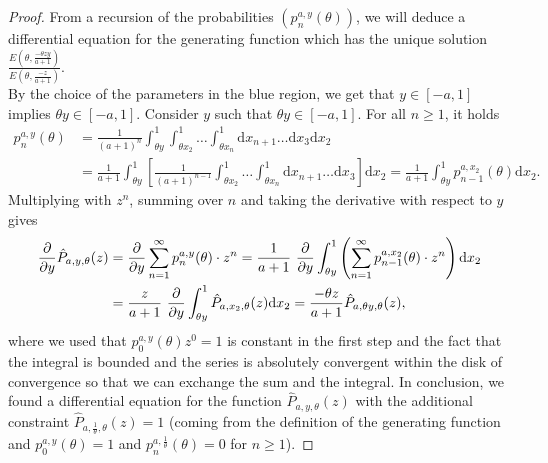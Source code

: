 \documentclass[12pt]{article}
\renewcommand{\P}{\mathbb{P}} %
\newcommand{\1}{\mathds{1}}
\renewcommand{\d}{\mathrm{d}}
\theoremstyle{definition}
\theoremstyle{plain}
\theoremstyle{remark}
\begin{document}
    \begin{proof}
        From a recursion of the probabilities $(p_n^{a,y}(\theta))$, we will deduce a differential equation for the generating function which has the unique solution $\frac{E\left(\theta,\frac{-\theta zy}{a+1}\right)}{E\left(\theta,\frac{-z}{a+1}\right)}$. \\
        By the choice of the parameters in the blue region, we get that $y\in[-a,1]$ implies $\theta y\in[-a,1]$. Consider $y$ such that $\theta y\in[-a,1]$. For all $n\geq 1$, it holds
        \begin{align*}
            p_n^{a,y}(\theta)&=\frac{1}{(a+1)^n}\int_{\theta y}^1\int_{\theta x_2}^1\dots\int_{\theta x_n}^1 \d x_{n+1}\dots \d x_3\d x_2\\&=\frac{1}{a+1}\int_{\theta y}^1\left[\frac{1}{(a+1)^{n-1}}\int_{\theta x_2}^1\dots\int_{\theta x_n}^1 \d x_{n+1}\dots \d x_3\right]\d x_2=\frac{1}{a+1}\int_{\theta y}^1p_{n-1}^{a,x_2}(\theta)\d x_2.
        \end{align*}
        Multiplying with $z^n$, summing over $n$ and  taking the derivative with respect to $y$ gives 
    \begin{align*}%
        \frac{\partial}{\partial y}\hat{P}_{a,y,\theta}(z)\notag
        &=\frac{\partial}{\partial y}\sum_{n=1}^{\infty} p_n^{a,y}(\theta)\cdot z^n
        = \frac{1}{a+1}~ \frac{\partial}{\partial y}\int_{\theta y}^1\left(\sum_{n=1}^{\infty} p_{n-1}^{a,x_2}(\theta)\cdot z^n\right) \d x_2\notag
     \\
     & =\frac{z}{a+1}~ \frac{\partial}{\partial y}\int_{\theta y}^1\hat{P}_{a,x_2,\theta}(z) \d x_2 \notag
      =\frac{-\theta z}{a+1}\hat{P}_{a,\theta y,\theta}(z),
    \end{align*}
    where we used that $p_0^{a,y}(\theta) z^0=1$ is constant in the first step and the fact that the integral is bounded and the series is absolutely convergent within the disk of convergence so that we can exchange the sum and the integral.
    In conclusion, we found a differential equation for the function $\hat{P}_{a,y,\theta}(z)$
    with the additional constraint $\hat{P}_{a,\frac{1}{\theta},\theta}(z)=1$ (coming from the definition of the generating function and $p_0^{a,y}(\theta)=1$ and $p_n^{a,\frac{1}{\theta}}(\theta)=0$ for $n\ge 1$).

\end{proof}
\end{document}
